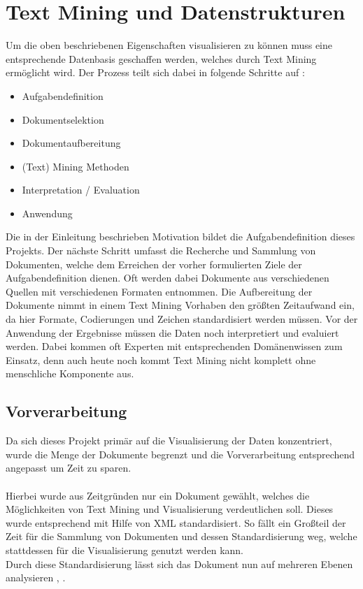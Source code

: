 \newpage
\section{Text Mining und Datenstrukturen}
Um die oben beschriebenen Eigenschaften visualisieren zu k\"onnen muss eine entsprechende Datenbasis geschaffen werden, welches durch Text Mining erm\"oglicht wird. Der Prozess teilt sich dabei in folgende Schritte auf \cite{Hipper} :
\begin{itemize}
\item Aufgabendefinition
\item Dokumentselektion
\item Dokumentaufbereitung
\item (Text) Mining Methoden
\item Interpretation / Evaluation
\item Anwendung
\end{itemize}
Die in der Einleitung beschrieben Motivation bildet die Aufgabendefinition dieses Projekts. Der n\"achste Schritt umfasst die Recherche und Sammlung von Dokumenten, welche dem Erreichen der vorher formulierten Ziele der Aufgabendefinition dienen. Oft werden dabei Dokumente aus verschiedenen Quellen mit verschiedenen Formaten entnommen. Die Aufbereitung der Dokumente nimmt in einem Text Mining Vorhaben den gr\"oßten Zeitaufwand ein, da hier Formate, Codierungen und Zeichen standardisiert werden m\"ussen. Vor der Anwendung der Ergebnisse m\"ussen die Daten noch interpretiert und evaluiert werden. Dabei kommen oft Experten mit entsprechenden Dom\"anenwissen zum Einsatz, denn auch heute noch kommt Text Mining nicht komplett ohne menschliche Komponente aus.

\subsection{Vorverarbeitung}
Da sich dieses Projekt prim\"ar auf die Visualisierung der Daten konzentriert, wurde die Menge der Dokumente begrenzt und die Vorverarbeitung entsprechend angepasst um Zeit zu sparen. \\
\\
Hierbei wurde aus Zeitgr\"unden nur ein Dokument gew\"ahlt, welches die M\"oglichkeiten von Text Mining und Visualisierung verdeutlichen soll. Dieses wurde entsprechend mit Hilfe von XML standardisiert. So f\"allt ein Großteil der Zeit f\"ur die Sammlung von Dokumenten und dessen Standardisierung weg, welche stattdessen f\"ur die Visualisierung genutzt werden kann. \\
Durch diese Standardisierung l\"asst sich das Dokument nun auf mehreren Ebenen analysieren \cite{Weiss} , \cite{Hipper} .

